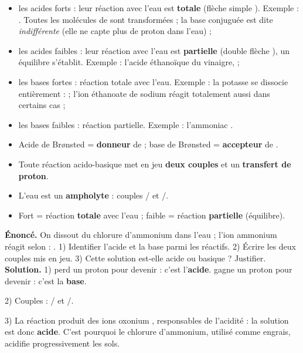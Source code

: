 \documentclass[11pt]{article}
\newcommand{\cle}[1]{{\popxbold\color{popdark}#1}}
\begin{document}
\begin{itemize}
\item les \cle{acides forts} : leur réaction avec l'eau est \textbf{totale} (flèche simple \ce{->}). Exemple : . Toutes les molécules de  sont transformées ; la base conjuguée  est dite \emph{indifférente} (elle ne capte plus de proton dans l'eau) ;
\item les \cle{acides faibles} : leur réaction avec l'eau est \textbf{partielle} (double flèche \ce{<=>}), un équilibre s'établit. Exemple : l'acide éthanoïque du vinaigre,  ;
\item les \cle{bases fortes} : réaction totale avec l'eau. Exemple : la potasse  se dissocie entièrement :  ; l'ion éthanoate de sodium réagit totalement aussi dans certains cas ;
\item les \cle{bases faibles} : réaction partielle. Exemple : l'ammoniac .
\end{itemize}

\begin{aretenir}[L'essentiel]
\begin{itemize}
\item Acide de Brønsted = \textbf{donneur} de  ; base de Brønsted = \textbf{accepteur} de .
\item Toute réaction acido-basique met en jeu \textbf{deux couples} et un \textbf{transfert de proton}.
\item L'eau est un \textbf{ampholyte} : couples / et /.
\item Fort = réaction \textbf{totale} avec l'eau ; faible = réaction \textbf{partielle} (équilibre).
\end{itemize}
\end{aretenir}

\begin{exoresolu}
\textbf{Énoncé.} On dissout du chlorure d'ammonium  dans l'eau ; l'ion ammonium réagit selon : . 1) Identifier l'acide et la base parmi les réactifs. 2) Écrire les deux couples mis en jeu. 3) Cette solution est-elle acide ou basique ? Justifier.
\tcblower
\textbf{Solution.} 1)  perd un proton pour devenir  : c'est l'\textbf{acide}.  gagne un proton pour devenir  : c'est la \textbf{base}. \par
2) Couples : / et /. \par
3) La réaction produit des ions oxonium , responsables de l'acidité : la solution est donc \textbf{acide}. C'est pourquoi le chlorure d'ammonium, utilisé comme engrais, acidifie progressivement les sols.
\end{exoresolu}
\end{document}
